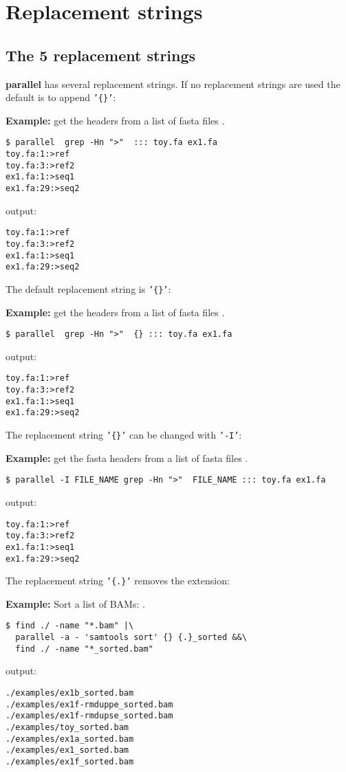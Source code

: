 \documentclass{article}
\newcommand{\example}[1]{
\textbf{Example: } {\color[rgb]{0,0,1} #1 } .
}
\newcommand{\cmdoption}[1]{\texttt{'#1'}}
\def\prl{\textbf{parallel}}
\begin{document}
\section{Replacement strings}
\subsection{The 5 replacement strings}
\prl{} has several replacement strings. If no replacement strings are used the default is to append \cmdoption{\{\}}:
\example{get the headers from a list of fasta files}
\begin{lstlisting}
$ parallel  grep -Hn ">"  ::: toy.fa ex1.fa
toy.fa:1:>ref
toy.fa:3:>ref2
ex1.fa:1:>seq1
ex1.fa:29:>seq2
\end{lstlisting}
output:
\begin{lstlisting}
toy.fa:1:>ref
toy.fa:3:>ref2
ex1.fa:1:>seq1
ex1.fa:29:>seq2
\end{lstlisting}

The default replacement string is \cmdoption{\{\}}:
\example{get the headers from a list of fasta files}
\begin{lstlisting}
$ parallel  grep -Hn ">"  {} ::: toy.fa ex1.fa
\end{lstlisting}
output:
\begin{lstlisting}
toy.fa:1:>ref
toy.fa:3:>ref2
ex1.fa:1:>seq1
ex1.fa:29:>seq2
\end{lstlisting}

The replacement string \cmdoption{\{\}} can be changed with \cmdoption{-I}:
\example{get the fasta headers from a list of fasta files}
\begin{lstlisting}
$ parallel -I FILE_NAME grep -Hn ">"  FILE_NAME ::: toy.fa ex1.fa
\end{lstlisting}
output:
\begin{lstlisting}
toy.fa:1:>ref
toy.fa:3:>ref2
ex1.fa:1:>seq1
ex1.fa:29:>seq2
\end{lstlisting}

The replacement string  \texttt{'\{.\}'} removes the extension:
\example{Sort a list of BAMs:}
\begin{lstlisting}
$ find ./ -name "*.bam" |\
  parallel -a - 'samtools sort' {} {.}_sorted &&\
  find ./ -name "*_sorted.bam"
\end{lstlisting}
output:
\begin{lstlisting}
./examples/ex1b_sorted.bam
./examples/ex1f-rmduppe_sorted.bam
./examples/ex1f-rmdupse_sorted.bam
./examples/toy_sorted.bam
./examples/ex1a_sorted.bam
./examples/ex1_sorted.bam
./examples/ex1f_sorted.bam
\end{lstlisting}
\end{document}
